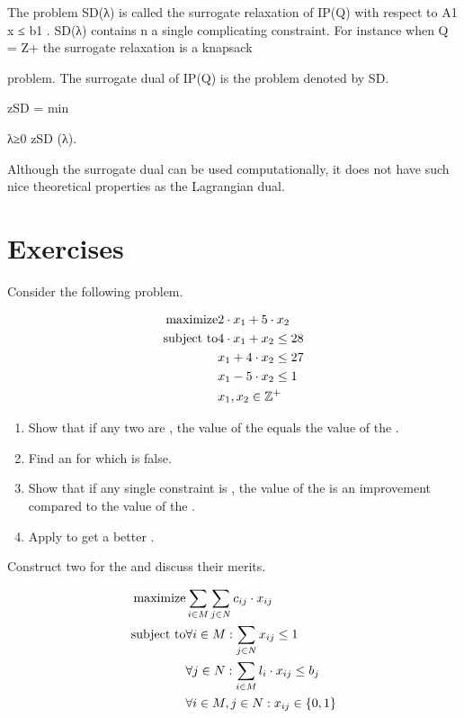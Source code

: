 The problem SD(λ) is called the surrogate relaxation of IP(Q) with respect to A1 x ≤ b1 . SD(λ) contains
n
a single complicating constraint. For instance when Q = Z+
the surrogate relaxation is a knapsack

problem. The surrogate dual of IP(Q) is the problem denoted by SD.

zSD = min

λ≥0 zSD (λ).

Although the surrogate dual can be used computationally, it does not have such nice theoretical properties
as the Lagrangian dual.

\section*{Exercises}
\begin{exercise}
Consider the following problem.

\begin{eqnarray}
\mbox{maximize}&2\cdot x_1+5\cdot x_2\eqnlab{ex71-m}\\
\mbox{subject to}&4\cdot x_1+x_2\leq28\eqnlab{ex71-c1}\\
&x_1+4\cdot x_2\leq27\eqnlab{ex71-c2}\\
&x_1-5\cdot x_2\leq1\eqnlab{ex71-c3}\\
&x_1,x_2\in\ZZZ^+\eqnlab{ex71-c4}
\end{eqnarray}

\begin{enumerate}
 \item {} Show that if any two  are , the value of the  equals the value of the .
 \item Find an  for which  is false.
 \item Show that if any single constraint is , the value of the  is an improvement compared to the value of the .
 \item Apply  to get a better .
\end{enumerate}
\end{exercise}

\begin{exercise}
Construct two  for the  and discuss their merits.

\begin{eqnarray}
\mbox{maximize}&\sumdomain[i]{M}{\sumdomain[j]{N}{c_{ij}\cdot x_{ij}}}\eqnlab{ex72-m}\\
\mbox{subject to}&\forall i\in M:\sumdomain[j]{N}{x_{ij}}\leq 1\eqnlab{ex72-c1}\\
&\forall j\in N:\sumdomain[i]{M}{l_i\cdot x_{ij}}\leq b_j\eqnlab{ex72-c2}\\
&\forall i\in M,j\in N:x_{ij}\in\accl{0,1}\eqnlab{ex72-c3}
\end{eqnarray}
\end{exercise}